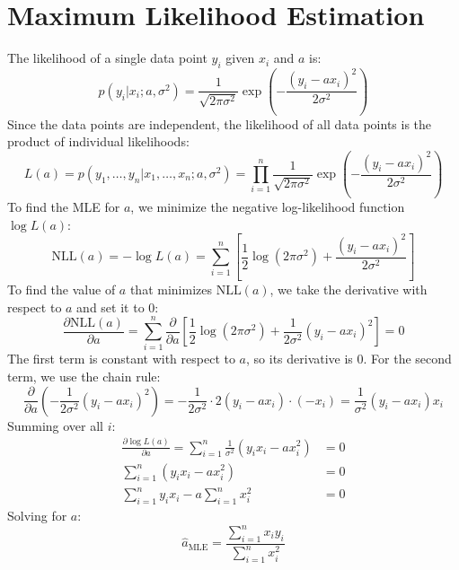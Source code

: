 \documentclass[11pt, a4paper, oneside]{memoir}
\begin{document}
\section{Maximum Likelihood Estimation}
The likelihood of a single data point $y_i$ given $x_i$ and $a$ is:
\[ p(y_i | x_i; a, \sigma^2) = \frac{1}{\sqrt{2\pi\sigma^2}} \exp\left( -\frac{(y_i - ax_i)^2}{2\sigma^2} \right) \]
Since the data points are independent, the likelihood of all data points is the product of individual likelihoods:
\[ L(a) = p(y_1, \dots, y_n | x_1, \dots, x_n; a, \sigma^2) = \prod_{i=1}^n \frac{1}{\sqrt{2\pi\sigma^2}} \exp\left( -\frac{(y_i - ax_i)^2}{2\sigma^2} \right) \]
To find the MLE for $a$, we minimize the negative log-likelihood function $\log L(a)$:
\[ \text{NLL}(a) = -\log L(a) = \sum_{i=1}^n \left[ \frac{1}{2} \log(2\pi\sigma^2) + \frac{(y_i - ax_i)^2}{2\sigma^2} \right] \]
To find the value of $a$ that minimizes $\text{NLL}(a)$, we take the derivative with respect to $a$ and set it to $0$:
\[ \frac{\partial \text{NLL}(a)}{\partial a} = \sum_{i=1}^n \frac{\partial}{\partial a} \left[ \frac{1}{2} \log(2\pi\sigma^2) + \frac{1}{2\sigma^2} (y_i - ax_i)^2 \right] = 0 \]
The first term is constant with respect to $a$, so its derivative is $0$. For the second term, we use the chain rule:
\[ \frac{\partial}{\partial a} \left( -\frac{1}{2\sigma^2} (y_i - ax_i)^2 \right) = -\frac{1}{2\sigma^2} \cdot 2(y_i - ax_i) \cdot (-x_i) = \frac{1}{\sigma^2} (y_i - ax_i)x_i \]
Summing over all $i$:
\begin{align*}
\frac{\partial \log L(a)}{\partial a} = \sum_{i=1}^n \frac{1}{\sigma^2} (y_i x_i - ax_i^2) &= 0 \\
\sum_{i=1}^n (y_i x_i - ax_i^2) &= 0 \\
\sum_{i=1}^n y_i x_i - a \sum_{i=1}^n x_i^2 &= 0
\end{align*}
Solving for $a$:
\[ \hat{a}_{\text{MLE}} = \frac{\sum_{i=1}^n x_i y_i}{\sum_{i=1}^n x_i^2} \]
\end{document}
